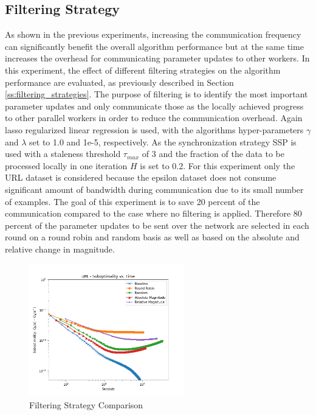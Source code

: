 \subsection{Filtering Strategy}
\label{ss:filtering_strategy}
As shown in the previous experiments, increasing the communication frequency can significantly benefit the overall algorithm performance but at the same time increases the overhead for communicating parameter updates to other workers.
In this experiment, the effect of different filtering strategies on the algorithm performance are evaluated, as previously described in Section \ref{ss:filtering_strategies}.
The purpose of filtering is to identify the most important parameter updates and only communicate those as the locally achieved progress to other parallel workers in order to reduce the communication overhead.
Again lasso regularized linear regression is used, with the algorithms hyper-parameters $\gamma$ and $\lambda$ set to 1.0 and 1e-5, respectively.
As the synchronization strategy SSP is used with a staleness threshold $\tau_{max}$ of 3 and the fraction of the data to be processed locally in one iteration $H$ is set to 0.2.
For this experiment only the URL dataset is considered because the epsilon dataset does not consume significant amount of bandwidth during communication due to its small number of examples.
The goal of this experiment is to save 20 percent of the communication compared to the case where no filtering is applied.
Therefore 80 percent of the parameter updates to be sent over the network are selected in each round on a round robin and random basis as well as based on the absolute and relative change in magnitude.
\begin{figure}[ht]
\centering
\includegraphics[width=0.6\textwidth]{img/filter_strat_cmp.png}
\caption{Filtering Strategy Comparison}
\label{fig:filt_strat_cmp}
\end{figure}
